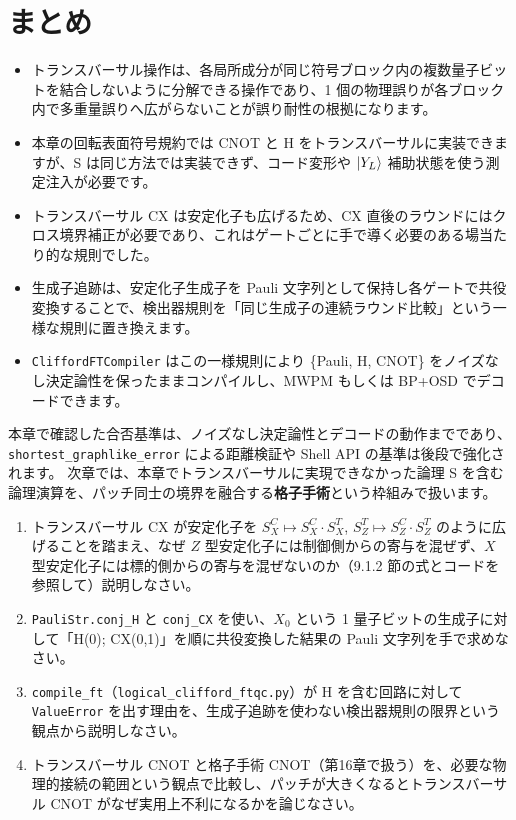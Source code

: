 \section{まとめ}\label{ch9:summary}

\begin{itemize}
  \item トランスバーサル操作は、各局所成分が同じ符号ブロック内の複数量子ビットを結合しないように分解できる操作であり、1 個の物理誤りが各ブロック内で多重量誤りへ広がらないことが誤り耐性の根拠になります。
  \item 本章の回転表面符号規約では CNOT と H をトランスバーサルに実装できますが、S は同じ方法では実装できず、コード変形や $\ket{Y_L}$ 補助状態を使う測定注入が必要です。
  \item トランスバーサル CX は安定化子も広げるため、CX 直後のラウンドにはクロス境界補正が必要であり、これはゲートごとに手で導く必要のある場当たり的な規則でした。
  \item 生成子追跡は、安定化子生成子を Pauli 文字列として保持し各ゲートで共役変換することで、検出器規則を「同じ生成子の連続ラウンド比較」という一様な規則に置き換えます。
  \item \texttt{CliffordFTCompiler} はこの一様規則により \{Pauli, H, CNOT\} をノイズなし決定論性を保ったままコンパイルし、MWPM もしくは BP+OSD でデコードできます。
\end{itemize}

本章で確認した合否基準は、ノイズなし決定論性とデコードの動作までであり、\texttt{shortest\_graphlike\_error} による距離検証や Shell API の基準は後段で強化されます。
次章では、本章でトランスバーサルに実現できなかった論理 S を含む論理演算を、パッチ同士の境界を融合する\textbf{格子手術}という枠組みで扱います。

\begin{exercise}
  \begin{enumerate}
    \item トランスバーサル CX が安定化子を $S_X^C \mapsto S_X^C \cdot S_X^T$, $S_Z^T \mapsto S_Z^C \cdot S_Z^T$ のように広げることを踏まえ、なぜ $Z$ 型安定化子には制御側からの寄与を混ぜず、$X$ 型安定化子には標的側からの寄与を混ぜないのか（9.1.2 節の式とコードを参照して）説明しなさい。
    \item \texttt{PauliStr.conj\_H} と \texttt{conj\_CX} を使い、$X_0$ という 1 量子ビットの生成子に対して「H(0); CX(0,1)」を順に共役変換した結果の Pauli 文字列を手で求めなさい。
    \item \texttt{compile\_ft}（\texttt{logical\_clifford\_ftqc.py}）が H を含む回路に対して \texttt{ValueError} を出す理由を、生成子追跡を使わない検出器規則の限界という観点から説明しなさい。
    \item トランスバーサル CNOT と格子手術 CNOT（第16章で扱う）を、必要な物理的接続の範囲という観点で比較し、パッチが大きくなるとトランスバーサル CNOT がなぜ実用上不利になるかを論じなさい。
  \end{enumerate}
\end{exercise}
